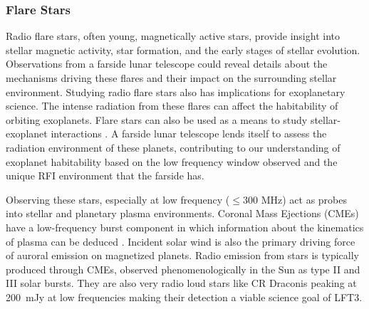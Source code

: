 \subsubsection{Flare Stars}

Radio flare stars, often young, magnetically active stars, provide insight into stellar magnetic activity, star formation, and the early stages of stellar evolution. Observations from a farside lunar telescope could reveal details about the mechanisms driving these flares and their impact on the surrounding stellar environment. Studying radio flare stars also has implications for exoplanetary science. The intense radiation from these flares can affect the habitability of orbiting exoplanets. Flare stars can also be used as a means to study stellar-exoplanet interactions \citep{joe_nature_review}. A farside lunar telescope lends itself to assess the radiation environment of these planets, contributing to our understanding of exoplanet habitability based on the low frequency window observed and the unique RFI environment that the farside has.

Observing these stars, especially at low frequency ($\leq 300$ MHz) act as probes into stellar and planetary plasma environments. Coronal Mass Ejections (CMEs) have a low-frequency burst component in which information about the kinematics of plasma can be deduced \citep{villadsen_ultra-wideband_2019}. Incident solar wind is also the primary driving force of auroral emission on magnetized planets. Radio emission from stars is typically produced through CMEs, observed phenomenologically in the Sun as type II and III solar bursts. They are also very radio loud stars like CR Draconis peaking at 200~mJy at low frequencies \citep{callingham_low-frequency_2021} making their detection a viable science goal of LFT3. 

